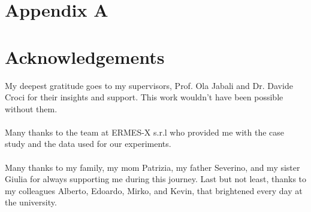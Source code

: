 \documentclass{Configuration_Files/PoliMi3i_thesis}
\theoremstyle{colored}
\theoremstyle{colored}
\begin{document}
    \chapter{Appendix A}
    
    
    
    


    \listoffigures

    \listoftables


    \chapter*{Acknowledgements}
    My deepest gratitude goes to my supervisors, Prof. Ola Jabali and Dr. Davide Croci for their insights and support. This work wouldn't have been possible without them.\\
    \\
    Many thanks to the team at ERMES-X s.r.l who provided me with the case study and the data used for our experiments.\\
    \\
    Many thanks to my family, my mom Patrizia, my father Severino, and my sister Giulia for always supporting me during this journey.
    Last but not least, thanks to my colleagues Alberto, Edoardo, Mirko, and Kevin, that brightened every day at the university.
    \cleardoublepage
\end{document}
